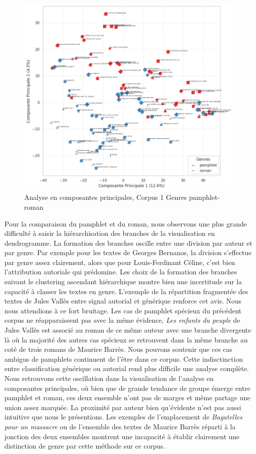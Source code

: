 \begin{figure}[H]
\centering %
\includegraphics[width=1\textwidth]{img/ACP-corpus-2-PamRoman.png}
\caption{Analyse en composantes principales, Corpus 1 Genres pamphlet-roman}
\label{'fig:ACP-corpus-2-PamRoman'}
\end{figure}

Pour la comparaison du pamphlet et du roman, nous observons une plus grande difficulté à saisir la hiérarchisation des branches de la visualisation en dendrogramme. La formation des branches oscille entre une division par auteur et par genre. Par exemple pour les textes de Georges Bernanos, la division s'effectue par genre assez clairement, alors que pour Louis-Ferdinant Céline, c'est bien l'attribution autoriale qui prédomine. Les choix de la formation des branches suivant le clustering ascendant hiérarchique montre bien une incertitude sur la capacité à classer les textes en genre. L'exemple de la répartition fragmentée des textes de Jules Vallès entre signal autorial et générique renforce cet avis. Nous nous attendions à ce fort bruitage. Les cas de pamphlet spécieux du précédent corpus ne réapparaissent pas avec la même évidence, \textit{Les enfants du peuple} de Jules Vallès est associé au roman de ce même auteur avec une branche divergente là où la majorité des autres cas spécieux se retrouvent dans la même branche au coté de trois romans de Maurice Barrès. Nous pouvons soutenir que ces cas ambigus de pamphlets continuent de l'être dans ce corpus. Cette indisctinction entre classification générique ou autorial rend plus difficile une analyse complète.
Nous retrouvons cette oscillation dans la visualisation de l'analyse en composantes principales, où bien que de grande tendance de groupe émerge entre pamphlet et roman, ces deux ensemble n'ont pas de marges et même partage une union assez marquée. La proximité par auteur bien qu'évidente n'est pas aussi intuitive que nous le présentions. Les exemples de l'emplacement de \textit{Bagatelles pour un massacre} ou de l'ensemble des textes de Maurice Barrès réparti à la jonction des deux ensembles montrent une incapacité à établir clairement une distinction de genre par cette méthode sur ce corpus.

